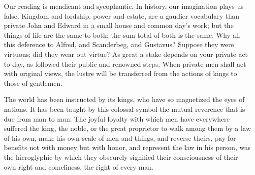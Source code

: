 \documentclass{article}
\begin{document}
Our reading is mendicant and sycophantic. In history, our imagination plays
us false. Kingdom and lordship, power and estate, are a gaudier vocabulary
than private John and Edward in a small house and common day's work; but the
things of life are the same to both; the sum total of both is the same. Why
all this deference to Alfred, and Scanderbeg, and Gustavus? Suppose they
were virtuous; did they wear out virtue? As great a stake depends on your
private act to-day, as followed their public and renowned steps. When
private men shall act with original views, the lustre will be transferred
from the actions of kings to those of gentlemen.

The world has been instructed by its kings, who have so magnetized the eyes
of nations. It has been taught by this colossal symbol the mutual reverence
that is due from man to man. The joyful loyalty with which men have
everywhere suffered the king, the noble, or the great proprietor to walk
among them by a law of his own, make his own scale of men and things, and
reverse theirs, pay for benefits not with money but with honor, and
represent the law in his person, was the hieroglyphic by which they
obscurely signified their consciousness of their own right and comeliness,
the right of every man.
\end{document}

